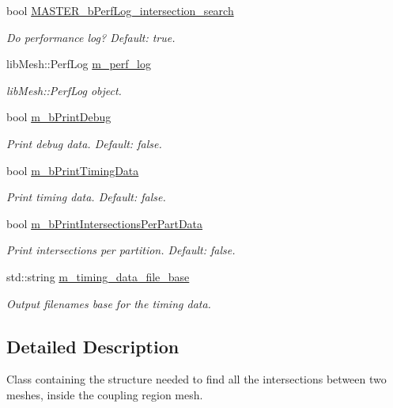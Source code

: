 \begin{DoxyCompactItemize}
bool \hyperlink{classcarl_1_1_intersection___search_a0b83cc0d7b90bae06f01a53555c0fc97}{M\+A\+S\+T\+E\+R\+\_\+b\+Perf\+Log\+\_\+intersection\+\_\+search}
\begin{DoxyCompactList}\small\item\em Do performance log? {\itshape Default\+:} true. \end{DoxyCompactList}\item 
lib\+Mesh\+::\+Perf\+Log \hyperlink{classcarl_1_1_intersection___search_aebe6210287a36909206b1a59f9cd17e0}{m\+\_\+perf\+\_\+log}
\begin{DoxyCompactList}\small\item\em lib\+Mesh\+::\+Perf\+Log object. \end{DoxyCompactList}\item 
bool \hyperlink{classcarl_1_1_intersection___search_af69485e014f8178ec6c6dcbd95bf9dc9}{m\+\_\+b\+Print\+Debug}
\begin{DoxyCompactList}\small\item\em Print debug data. {\itshape Default\+:} false. \end{DoxyCompactList}\item 
bool \hyperlink{classcarl_1_1_intersection___search_a01537442f23786cbe1766ac340858020}{m\+\_\+b\+Print\+Timing\+Data}
\begin{DoxyCompactList}\small\item\em Print timing data. {\itshape Default\+:} false. \end{DoxyCompactList}\item 
bool \hyperlink{classcarl_1_1_intersection___search_a32e74e1f2aaaf5630b57091d01e5932b}{m\+\_\+b\+Print\+Intersections\+Per\+Part\+Data}
\begin{DoxyCompactList}\small\item\em Print intersections per partition. {\itshape Default\+:} false. \end{DoxyCompactList}\item 
std\+::string \hyperlink{classcarl_1_1_intersection___search_aea1aa01a86b5cdb7bea5ac9e7f73105f}{m\+\_\+timing\+\_\+data\+\_\+file\+\_\+base}
\begin{DoxyCompactList}\small\item\em Output filenames base for the timing data. \end{DoxyCompactList}\end{DoxyCompactItemize}


\subsection{Detailed Description}
Class containing the structure needed to find all the intersections between two meshes, inside the coupling region mesh. 

